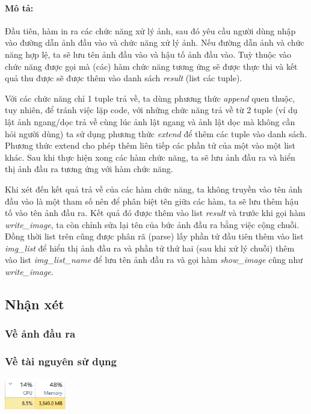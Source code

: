 \documentclass[]{article}
\begin{document}
\paragraph{Mô tả:} Đầu tiên, hàm in ra các chức năng xử lý ảnh, sau đó yêu cầu người dùng nhập vào đường dẫn ảnh đầu vào và chức năng xử lý ảnh. Nếu đường dẫn ảnh và chức năng hợp lệ, ta sẽ lưu tên ảnh đầu vào và hậu tố ảnh đầu vào. Tuỳ thuộc vào chức năng được gọi mà (các) hàm chức năng tương ứng sẽ được thực thi và kết quả thu được sẽ được thêm vào danh sách \textit{result} (list các tuple). \par
Với các chức năng chỉ 1 tuple trả về, ta dùng phương thức \textit{append} quen thuộc, tuy nhiên, để tránh việc lặp code, với những chức năng trả về từ 2 tuple (ví dụ lật ảnh ngang/dọc trả về cùng lúc ảnh lật ngang và ảnh lật dọc mà không cần hỏi người dùng) ta sử dụng phương thức \textit{extend} để thêm các tuple vào danh sách. Phương thức extend cho phép thêm liên tiếp các phần tử của một vào một list khác. Sau khi thực hiện xong các hàm chức năng, ta sẽ lưu ảnh đầu ra và hiển thị ảnh đầu ra tương ứng với hàm chức năng. \par
Khi xét đến kết quả trả về của các hàm chức năng, ta không truyền vào tên ảnh đầu vào là một tham số nên để phân biệt tên giữa các hàm, ta sẽ lưu thêm hậu tố vào tên ảnh đầu ra. Kết quả đó được thêm vào list \textit{result} và trước khi gọi hàm \textit{write\_image}, ta còn chỉnh sửa lại tên của bức ảnh đầu ra bằng việc cộng chuỗi. Đồng thời list trên cũng được phân rã (parse) lấy phần tử đầu tiên thêm vào list \textit{img\_list} để hiển thị ảnh đầu ra và phần tử thứ hai (sau khi xử lý chuỗi) thêm vào list \textit{img\_list\_name} để lưu tên ảnh đầu ra và gọi hàm \textit{show\_image} cũng như \textit{write\_image}.
\subsection{Nhận xét}
\subsubsection{Về ảnh đầu ra}

\subsubsection{Về tài nguyên sử dụng}

\centerline{\includegraphics[width=0.2\textwidth]{image/performance.png}}
\newpage
\end{document}

